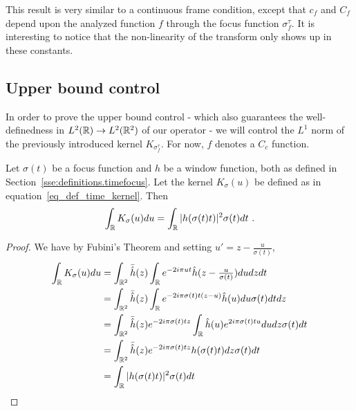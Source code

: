 \begin{remark}
   This result is very similar to a continuous frame condition, except that $c_f$ and $C_f$ depend upon the analyzed function $f$ through the focus function $\sigma_f^\tau$. It is interesting to notice that the non-linearity of the transform only shows up in these constants.
\end{remark}

\subsection{Upper bound control}

In order to prove the upper bound control - which also guarantees the well-definedness in $L^2(\mathbb{R})\rightarrow L^2(\mathbb{R}^2)$ of our operator - we will control the $L^1$ norm of the previously introduced kernel $K_{\sigma_f^\tau}$. For now, $f$ denotes a $C_c$ function.
\begin{lemma}\label{lemma_norm_control_time_kernel_L1}
	Let $\sigma(t)$ be a focus function and $h$ be a window function, both as defined in Section~\ref{sse:definitions.timefocus}. Let the kernel $K_\sigma(u)$ be defined as in equation~\eqref{eq_def_time_kernel}.
	Then
	\begin{equation}
		\int_{\mathbb{R}} K_\sigma(u)du = \int_{\mathbb{R}} |h(\sigma(t)t)|^2 \sigma(t)dt\ .
	\end{equation}
\end{lemma}
\begin{proof}
	We have by Fubini's Theorem and setting $u' = z - \tfrac{u}{\sigma(t)}$,
	\begin{align*}
		\int_{\mathbb{R}} K_\sigma(u)du & = \int_{\mathbb{R}^2} \bar{\hat{h}}(z)\int_{\mathbb{R}} e^{-2i\pi ut}\hat{h}(z-\tfrac{u}{\sigma(t)}) du dzdt \\
		& = \int_{\mathbb{R}^2} \bar{\hat{h}}(z) \int_{\mathbb{R}} e^{-2i\pi \sigma(t)t(z-u)}\hat{h}(u) du\sigma(t)dtdz \\
		& = \int_{\mathbb{R}^2} \bar{\hat{h}}(z)e^{-2i\pi \sigma(t)tz}\int_{\mathbb{R}}\hat{h}(u)e^{2i\pi \sigma(t)tu}dudz\sigma(t)dt\\
		& = \int_{\mathbb{R}^2} \bar{\hat{h}}(z)e^{-2i\pi \sigma(t)tz}h(\sigma(t)t) dz\sigma(t)dt \\
		& = \int_{\mathbb{R}} |h(\sigma(t)t)|^2\sigma(t)dt
	\end{align*}
\end{proof}

